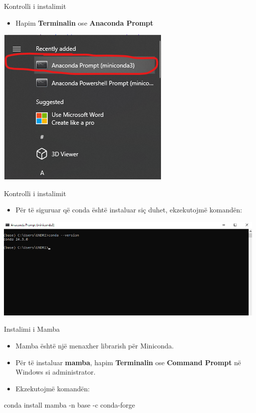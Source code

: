 \documentclass[
  ignorenonframetext,
]{beamer}
\newenvironment{Shaded}{\begin{snugshade}}{\end{snugshade}}
\newcommand{\NormalTok}[1]{#1}
\providecommand{\tightlist}{%
  \setlength{\itemsep}{0pt}\setlength{\parskip}{0pt}}
\begin{document}
\begin{frame}{Kontrolli i instalimit}
\protect\hypertarget{kontrolli-i-instalimit}{}
\begin{itemize}
\tightlist
\item
  Hapim \textbf{Terminalin} ose \textbf{Anaconda Prompt}
\end{itemize}

\includegraphics{./Figs/anac_prompt.png}
\end{frame}

\begin{frame}{Kontrolli i instalimit}
\protect\hypertarget{kontrolli-i-instalimit-1}{}
\begin{itemize}
\tightlist
\item
  Për të siguruar që conda është instaluar siç duhet, ekzekutojmë
  komandën:
\end{itemize}

\includegraphics{./Figs/conda_ver.png}
\end{frame}

\begin{frame}[fragile]{Instalimi i Mamba}
\protect\hypertarget{instalimi-i-mamba}{}
\begin{itemize}
\item
  Mamba është një menaxher librarish për Miniconda.
\item
  Për të instaluar \textbf{mamba}, hapim \textbf{Terminalin} ose
  \textbf{Command Prompt} në Windows si administrator.
\item
  Ekzekutojmë komandën:
\end{itemize}

\begin{Shaded}
\begin{Highlighting}[]
\NormalTok{  conda install mamba {-}n base {-}c conda{-}forge}
\end{Highlighting}
\end{Shaded}
\end{frame}
\end{document}
